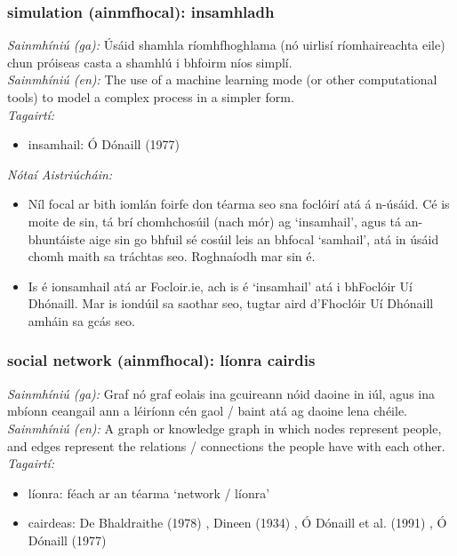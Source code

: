 \subsubsection*{simulation (ainmfhocal): insamhladh}
 \noindent \textit{Sainmhíniú (ga):} Úsáid shamhla ríomhfhoghlama (nó uirlisí ríomhaireachta eile) chun próiseas casta a shamhlú i bhfoirm níos simplí.
\\
 \noindent \textit{Sainmhíniú (en):} The use of a machine learning mode (or other computational tools) to model a complex process in a simpler form.
\\
 \noindent \textit{Tagairtí:}
\begin{itemize}
	\item insamhail: Ó Dónaill (1977) \cite{odonaill}
\end{itemize}

 \noindent \textit{Nótaí Aistriúcháin:}
\begin{itemize}
	\item Níl focal ar bith iomlán foirfe don téarma seo sna foclóirí atá á n-úsáid. Cé is moite de sin, tá brí chomhchosúil (nach mór) ag `insamhail', agus tá an-bhuntáiste aige sin go bhfuil sé cosúil leis an bhfocal `samhail', atá in úsáid chomh maith sa tráchtas seo. Roghnaíodh mar sin é.
	\item Is é ionsamhail atá ar Focloir.ie, ach is é `insamhail' atá i bhFoclóir Uí Dhónaill. Mar is iondúil sa saothar seo, tugtar aird d'Fhoclóir Uí Dhónaill amháin sa gcás seo.
\end{itemize}


\subsubsection*{social network (ainmfhocal): líonra cairdis}
 \noindent \textit{Sainmhíniú (ga):} Graf nó graf eolais ina gcuireann nóid daoine in iúl, agus ina mbíonn ceangail ann a léiríonn cén gaol / baint atá ag daoine lena chéile.
\\
 \noindent \textit{Sainmhíniú (en):} A graph or knowledge graph in which nodes represent people, and edges represent the relations / connections the people have with each other.
\\
 \noindent \textit{Tagairtí:}
\begin{itemize}
	\item líonra: féach ar an téarma `network / líonra'
	\item cairdeas: De Bhaldraithe (1978) \cite{de-bhaldraithe}, Dineen (1934) \cite{dineen}, Ó Dónaill et al. (1991) \cite{focloir-beag}, Ó Dónaill (1977) \cite{odonaill}
\end{itemize}

